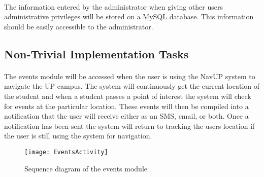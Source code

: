 \documentclass{article}
\begin{document}
\paragraph{} The information entered by the administrator when giving other users administrative privileges will be stored on a MySQL database. This information should be easily accessible to the administrator.


\subsection{Non-Trivial Implementation Tasks}
\paragraph{} The events module will be accessed when the user is using the NavUP system to navigate the UP campus. The system will continuously get the current location of the student and when a student passes a point of interest the system will check for events at the particular location. These events will then be compiled into a notification that the user will receive either as an SMS, email, or both. Once a notification has been sent the system will return to tracking the users location if the user is still using the system for navigation.\\

\begin{figure}[H]
\centering
\texttt{[image: EventsActivity]}
\caption{Sequence diagram of the events module}
\end{figure}
\end{document}
